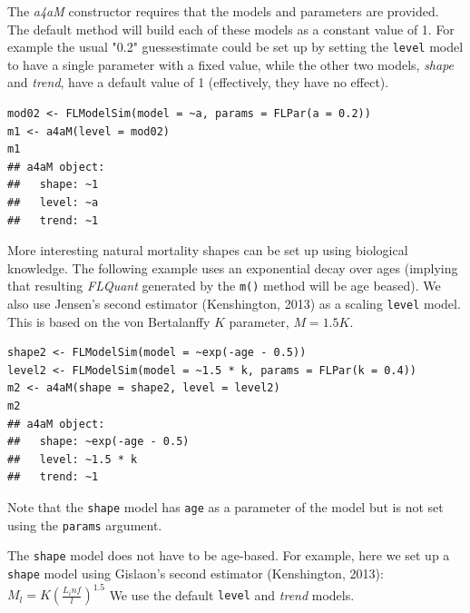 \documentclass[a4paper,english,10pt]{article}\usepackage[]{graphicx}\usepackage[]{color}
\makeatletter
\newenvironment{kframe}{%
 \def\at@end@of@kframe{}%
 \ifinner\ifhmode%
  \def\at@end@of@kframe{\end{minipage}}%
  \begin{minipage}{\columnwidth}%
 \fi\fi%
 \def\FrameCommand##1{\hskip\@totalleftmargin \hskip-\fboxsep
 \colorbox{shadecolor}{##1}\hskip-\fboxsep
     \hskip-\linewidth \hskip-\@totalleftmargin \hskip\columnwidth}%
 \MakeFramed {\advance\hsize-\width
   \@totalleftmargin\z@ \linewidth\hsize
   \@setminipage}}%
 {\par\unskip\endMakeFramed%
 \at@end@of@kframe}
\newenvironment{knitrout}{}{} %
\newcommand{\code}[1]{{\texttt{#1}}}
\newcommand{\class}[1]{{\textit{#1}}}
\makeatother
\begin{document}
The \class{a4aM} constructor requires that the models and parameters are provided. The default method will build each of these models as a constant value of 1. For example the usual "0.2" guessestimate could be set up by setting the \code{level} model to have a single parameter with a fixed value, while the other two models, \class{shape} and \class{trend}, have a default value of 1 (effectively, they have no effect).

\begin{knitrout}
\color{fgcolor}\begin{kframe}
\begin{verbatim}
mod02 <- FLModelSim(model = ~a, params = FLPar(a = 0.2))
m1 <- a4aM(level = mod02)
m1
## a4aM object:
##   shape: ~1
##   level: ~a
##   trend: ~1
\end{verbatim}
\end{kframe}
\end{knitrout}


More interesting natural mortality shapes can be set up using biological knowledge. The following example uses an exponential decay over ages (implying that resulting \class{FLQuant} generated by the \code{m()} method will be age beased). We also use Jensen's second estimator (Kenshington, 2013) as a scaling \code{level} model. This is based on the von Bertalanffy $K$ parameter, $M=1.5K$. 

\begin{knitrout}
\color{fgcolor}\begin{kframe}
\begin{verbatim}
shape2 <- FLModelSim(model = ~exp(-age - 0.5))
level2 <- FLModelSim(model = ~1.5 * k, params = FLPar(k = 0.4))
m2 <- a4aM(shape = shape2, level = level2)
m2
## a4aM object:
##   shape: ~exp(-age - 0.5)
##   level: ~1.5 * k
##   trend: ~1
\end{verbatim}
\end{kframe}
\end{knitrout}


Note that the \code{shape} model has \code{age} as a parameter of the model but is not set using the \code{params} argument.

The \code{shape} model does not have to be age-based. For example, here we set up a \code{shape} model using Gislaon's second estimator (Kenshington, 2013):
$M_l=K(\frac{L_inf}{l})^1.5$
We use the default \code{level} and \class{trend} models.
\end{document}
